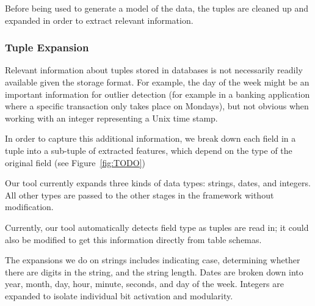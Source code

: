 
Before being used to generate a model of the data, the tuples are cleaned up and expanded in order to extract relevant information. 

\subsubsection{Tuple Expansion}

Relevant information about tuples stored in databases is not necessarily readily available given the storage format. For example, the day of the week might be an important information for outlier detection (for example in a banking application where a specific transaction only takes place on Mondays), but not obvious when working with an integer representing a Unix time stamp.

In order to capture this additional information, we break down each field in a tuple into a sub-tuple of extracted features, which depend on the type of the original field (see Figure~\ref{fig:TODO})

Our tool currently expands three kinds of data types: strings, dates, and integers. All other types are passed to the other stages in the framework without modification.

Currently, our tool automatically detects field type as tuples are read in; it could also be modified to get this information directly from table schemas.

The expansions we do on strings includes indicating case, determining whether there are digits in the string, and the string length.
Dates are broken down into year, month, day, hour, minute, seconds, and day of the week.
Integers are expanded to isolate individual bit activation and modularity.


